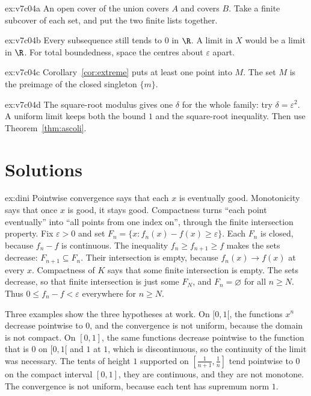 \begin{hint}{ex:v7c04a}
An open cover of the union covers $A$ and covers $B$. Take a finite subcover of each set, and put the two finite lists together.
\end{hint}
\begin{hint}{ex:v7c04b}
Every subsequence still tends to $0$ in $\R$. A limit in $X$ would be a limit in $\R$. For total boundedness, space the centres about $\varepsilon$ apart.
\end{hint}
\begin{hint}{ex:v7c04c}
Corollary~\ref{cor:extreme} puts at least one point into $M$. The set $M$ is the preimage of the closed singleton $\{m\}$.
\end{hint}
\begin{hint}{ex:v7c04d}
The square-root modulus gives one $\delta$ for the whole family: try $\delta=\varepsilon^2$. A uniform limit keeps both the bound $1$ and the square-root inequality. Then use Theorem~\ref{thm:ascoli}.
\end{hint}

\section{Solutions}

\begin{solution}{ex:dini}
\idea Pointwise convergence says that each $x$ is eventually good. Monotonicity says that once $x$ is good, it stays good. Compactness turns ``each point eventually'' into ``all points from one index on'', through the finite intersection property.
\writeup Fix $\varepsilon>0$ and set $F_n=\{x:f_n(x)-f(x)\ge\varepsilon\}$. Each $F_n$ is closed, because $f_n-f$ is continuous. The inequality $f_n\ge f_{n+1}\ge f$ makes the sets decrease: $F_{n+1}\subseteq F_n$. Their intersection is empty, because $f_n(x)\to f(x)$ at every $x$. Compactness of $K$ says that some finite intersection is empty. The sets decrease, so that finite intersection is just some $F_N$, and $F_n=\varnothing$ for all $n\ge N$. Thus $0\le f_n-f<\varepsilon$ everywhere for $n\ge N$.

Three examples show the three hypotheses at work. On $[0,1[$, the functions $x^n$ decrease pointwise to $0$, and the convergence is not uniform, because the domain is not compact. On $[0,1]$, the same functions decrease pointwise to the function that is $0$ on $[0,1[$ and $1$ at $1$, which is discontinuous, so the continuity of the limit was necessary. The tents of height $1$ supported on $[\frac1{n+1},\frac1n]$ tend pointwise to $0$ on the compact interval $[0,1]$, they are continuous, and they are not monotone. The convergence is not uniform, because each tent has supremum norm $1$.
\end{solution}

